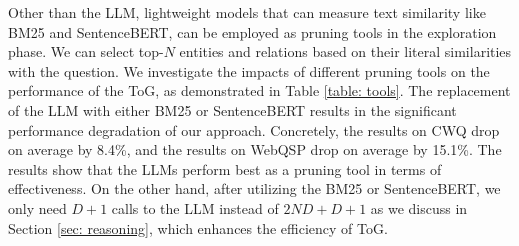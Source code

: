 \documentclass{article} %
\begin{document}
\begin{table}
\centering
\vspace{-0.5cm}
\caption{Performances of ToG using different pruning tools.}
\label{table: tools}
\end{table}
Other than the LLM, lightweight models that can measure text similarity like BM25 and SentenceBERT, can be employed as pruning tools in the exploration phase. We can select top-$N$ entities and relations based on their literal similarities with the question. We investigate the impacts of different pruning tools on the performance of the ToG, as demonstrated in Table \ref{table: tools}. The replacement of the LLM with either BM25 or SentenceBERT results in the significant performance degradation of our approach. Concretely, the results on CWQ drop on average by 8.4\%, and the results on WebQSP drop on average by 15.1\%.
The results show that the LLMs perform best as a pruning tool in terms of effectiveness. On the other hand, after utilizing
the BM25 or SentenceBERT, we only need $D + 1$ calls to the LLM instead of $2ND + D + 1$ as we
discuss in Section \ref{sec: reasoning}, which enhances the efficiency of ToG. 
\end{document}
